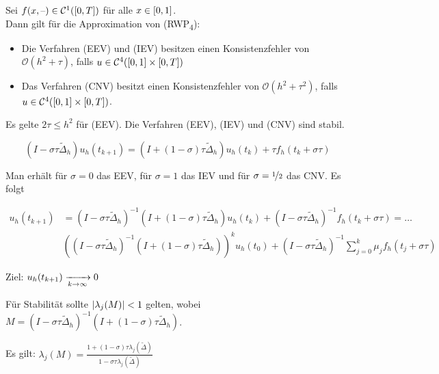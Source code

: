 \documentclass{cheat-sheet}
\newcommand{\Cont}{\mathcal{C}} %
\newcommand{\Laplace}{\Delta}
\newcommand{\tss}[1]{\textsubscript{#1}} %
\renewcommand{\O}{\mathcal{O}} %
\begin{document}
\begin{lem}
  Sei $f(x, \blank) \in \Cont^1(\cinterval{0}{T})$ für alle $x \in \left[ 0, 1 \right]$. \\
  Dann gilt für die Approximation von (RWP\tss{4}):
  \begin{itemize}
    \item Die Verfahren (EEV) und (IEV) besitzen einen Konsistenzfehler von $\O(h^2 + \tau)$, falls $u \in \Cont^4(\cinterval{0}{1} \times \cinterval{0}{T})$
    \item Das Verfahren (CNV) besitzt einen Konsistenzfehler von $\O(h^2 + \tau^2)$, falls $u \in \Cont^4(\cinterval{0}{1} \times \cinterval{0}{T})$.
  \end{itemize}
\end{lem}



\begin{lem}
  Es gelte $2 \tau \leq h^2$ für (EEV).
  Die Verfahren (EEV), (IEV) und (CNV) sind stabil.
\end{lem}

\iffalse
\[
  (I - \sigma \tau \tilde{\Laplace}_h ) u_h(t_{k+1}) = (I + (1 - \sigma) \tau \tilde{\Laplace}_h ) u_h(t_k) + \tau f_h(t_k + \sigma \tau)
\]

Man erhält für $\sigma=0$ das EEV, für $\sigma=1$ das IEV und für $\sigma = \nicefrac{1}{2}$ das CNV.
Es folgt

\begin{align*}
  u_h(t_{k+1}) & = (I - \sigma \tau \tilde{\Laplace}_h)^{-1} (I + (1-\sigma) \tau \tilde{\Laplace}_h) u_h(t_k) + (I - \sigma \tau \tilde{\Laplace}_h)^{-1} f_h(t_k + \sigma \tau) = \ldots \\
  & \left( (I - \sigma \tau \tilde{\Laplace}_h)^{-1} (I + (1-\sigma) \tau \tilde{\Laplace}_h) \right)^{k} u_h(t_0) + (I - \sigma \tau \tilde{\Laplace}_h)^{-1} \sum_{j=0}^k \mu_j f_h(t_j + \sigma \tau)
\end{align*}

Ziel: $u_h(t_{k+1}) \xrightarrow[k \to \infty]{} 0$

Für Stabilität sollte $\lvert\lambda_j(M)\rvert < 1$ gelten, wobei $M = (I - \sigma \tau \tilde{\Laplace}_h)^{-1} (I + (1-\sigma) \tau \tilde{\Laplace}_h)$.

Es gilt: $\lambda_j(M) = \frac{1 + (1 - \sigma) \tau \lambda_j(\tilde{\Laplace})}{1 - \sigma \tau \lambda_j(\tilde{\Laplace})}$
\end{document}

